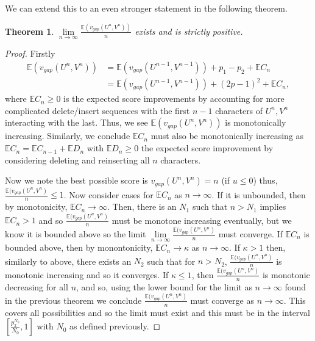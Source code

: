 \documentclass{article}
\newtheorem{theorem}{Theorem}[section]
\begin{document}
We can extend this to an even stronger statement in the following theorem.
\begin{theorem}
$\underset{n \to \infty}{\lim} \frac{\mathbb{E}(v_{gap}(U^n,V^n))}{n}$ exists and is strictly positive.
\end{theorem}
\begin{proof}
Firstly
\begin{equation*}
\begin{split}
\mathbb{E}(v_{gap}(U^n,V^n)) &= \mathbb{E}(v_{gap}(U^{n-1},V^{n-1})) + p_1-p_2 + \mathbb{E}C_n \\
&= \mathbb{E}(v_{gap}(U^{n-1},V^{n-1}))+(2p-1)^2 +\mathbb{E}C_n,
\end{split}
\end{equation*}
where $\mathbb{E}C_n \geq 0$ is the expected score improvements by accounting for more complicated delete/insert sequences with the first $n-1$ characters of $U^n, V^n$ interacting with the last. Thus, we see $\mathbb{E}(v_{gap}(U^n,V^n))$ is monotonically increasing. Similarly, we conclude $\mathbb{E}C_n$ must also be monotonically increasing as $\mathbb{E}C_n = \mathbb{E}C_{n-1} + \mathbb{E}D_n$ with $\mathbb{E}D_n \geq 0$ the expected score improvement by considering deleting and reinserting all $n$ characters.

Now we note the best possible score is $v_{gap}(U^n,V^n) = n$ (if $u \leq 0$) thus, $\frac{\mathbb{E}(v_{gap}(U^n,V^n)}{n}\leq 1$. Now consider cases for $\mathbb{E}C_n$ as $n\to\infty$. If it is unbounded, then by monotonicity, $\mathbb{E}C_n \to \infty$. Then, there is an $N_1$ such that $n>N_1$ implies $\mathbb{E}C_n>1$ and so $\frac{\mathbb{E}(v_{gap}(U^n,V^n)}{n}$ must be monotone increasing eventually, but we know it is bounded above so the limit $\underset{n\to\infty}{\lim} \frac{\mathbb{E}(v_{gap}(U^n,V^n)}{n}$ must converge. If $\mathbb{E}C_n$ is bounded above, then by monontonicity, $\mathbb{E}C_n \to \kappa$ as $n\to\infty$. If $\kappa>1$ then, similarly to above, there exists an $N_2$ such that for $n>N_2$, $\frac{\mathbb{E}(v_{gap}(U^n,V^n)}{n}$ is monotonic increasing and so it converges. If $\kappa \leq 1$, then $\frac{\mathbb{E}(v_{gap}(U^n,V^n)}{n}$ is monotonic decreasing for all $n$, and so, using the lower bound for the limit as $n\to\infty$ found in the previous theorem we conclude $\frac{\mathbb{E}(v_{gap}(U^n,V^n)}{n}$ must converge as $n\to\infty$. This covers all possibilities and so the limit must exist and this must be in the interval $\left[ \frac{p_2^{N_0}}{N_0}, 1 \right]$ with $N_0$ as defined previously.
\end{proof}
\end{document}
